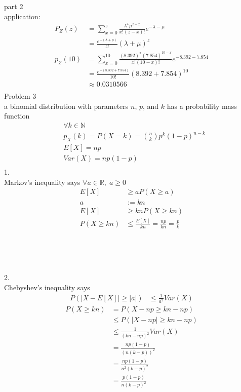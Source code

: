 \documentclass[12pt,border=4pt,multi]{article} %
\begin{document}
\newpage
\noindent
part 2\\
application:
\begin{align*}
P_Z(z) &= \sum_{x = 0}^{z} \frac{\lambda^x \mu^{z - x}}{x!(z - x)!}e^{-\lambda - \mu}\\
&= \frac{e^{-(\lambda + \mu)}}{z!}(\lambda + \mu)^z\\
p_Z(10) &= \sum_{x = 0}^{10} \frac{(8.392)^x (7.854)^{10 - x}}{x!(10 - x)!}e^{-8.392 - 7.854}\\
&= \boxed{\frac{e^{-(8.392 + 7.854)}}{10!}(8.392 + 7.854)^{10}}\\
&\approx \boxed{0.0310566}\\
\end{align*}
\newpage
\noindent
Problem 3\\
a binomial distribution with parameters $n$, $p$, and $k$ has a probability mass function
\begin{align*}
&\forall k \in \mathbb{N}\\
&p_X(k) = P(X = k) = \binom{n}{k}p^k (1 - p)^{n - k}\\
&E[X] = np\\
&Var(X) = np(1 - p)\\
\end{align*}
1.\\
Markov's inequality says $\forall a \in \mathbb{R},\; a \geq 0$  
\begin{align*}
E[X] &\geq aP(X \geq a)\\
a &:= kn\\
E[X] &\geq knP(X \geq kn)\\
P(X \geq kn) &\leq \frac{E[X]}{kn} = \frac{np}{kn} = \boxed{\frac{p}{k}}\\
\end{align*}
\\
\\
\\
\\
2.\\
Chebyshev's inequality says
\begin{align*}
P(|X - E[X]| \geq |a|) &\leq \frac{1}{a^2} Var(X)
\end{align*}
\begin{align*}
P(X \geq kn) &= P(X - np \geq kn - np)\\
&\leq P(|X - np| \geq kn - np)\\
&\leq \frac{1}{(kn - np)^2} Var(X)\\
&= \frac{np(1 - p)}{(n(k - p))^2}\\
&= \frac{np(1 - p)}{n^2(k - p)^2}\\
&= \boxed{\frac{p(1 - p)}{n(k - p)^2}}\\
\end{align*}
\end{document}
